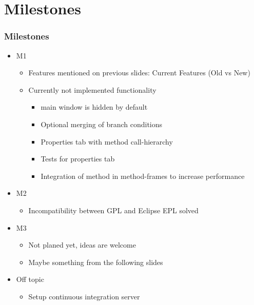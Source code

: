\documentclass[accentcolor=tud9d,colorbacktitle,inverttitle,landscape,english,presentation,t]{tudbeamer}
\begin{document}
\section{Milestones}
   \begin{frame}[t]
		\frametitle{Milestones}
      
      \begin{itemize}
         \item M1
               \begin{itemize}
                  \item Features mentioned on previous slides: Current Features (Old vs New)
                  \item Currently not implemented functionality
                        \begin{itemize}
                           \item \KeY main window is hidden by default
                           \item Optional merging of branch conditions
                           \item Properties tab with method call-hierarchy
                           \item Tests for properties tab
                           \item Integration of method in method-frames to increase performance
                        \end{itemize}
               \end{itemize}         
         \item M2
               \begin{itemize}
                  \item Incompatibility between \KeY GPL and Eclipse EPL solved
               \end{itemize}         
         \item M3
               \begin{itemize}
                  \item Not planed yet, ideas are welcome
                  \item Maybe something from the following slides
               \end{itemize}
         \item Off topic
               \begin{itemize}
                  \item Setup continuous integration server
               \end{itemize}         
      \end{itemize}
	\end{frame}
   
\end{document}
